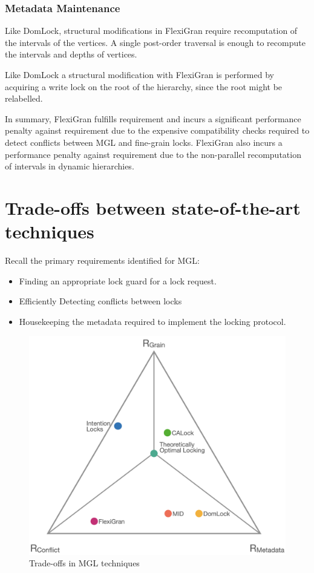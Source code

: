 \subsubsection{Metadata Maintenance}

Like DomLock, structural modifications in FlexiGran require recomputation of the intervals of the vertices. A single post-order traversal is enough to recompute the intervals and depths of vertices. 

Like DomLock a structural modification with FlexiGran is performed by acquiring a write lock on the root of the hierarchy, since the root might be relabelled.

In summary, FlexiGran fulfills requirement \Rb and incurs a significant performance penalty against requirement \Rc due to the expensive compatibility checks required to detect conflicts between MGL and fine-grain locks. FlexiGran also incurs a performance penalty against requirement \Rd due to the non-parallel recomputation of intervals in dynamic hierarchies.



\section{Trade-offs between state-of-the-art techniques}

Recall the primary requirements identified for MGL:
\begin{itemize}
    \item[\Rb] Finding an appropriate lock guard for a lock request.
    \item[\Rc] Efficiently Detecting conflicts between locks
    \item[\Rd] Housekeeping the metadata required to implement the locking protocol.
\end{itemize}

\begin{figure}[h]
    \centering
    \captionsetup{justification=centering}
    \includegraphics[width=.9\textwidth]{figures/MGL_comparision.png}
    \caption{Trade-offs in MGL techniques}
    \label{fig:tradeoffs}
\end{figure}


